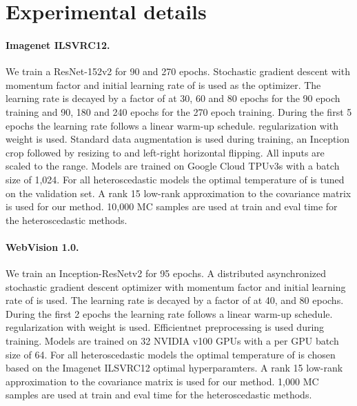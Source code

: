 \documentclass[final]{cvpr}
\begin{document}
\section{Experimental details}
\label{app:experimental_details}

\paragraph{Imagenet ILSVRC12.} We train a ResNet-152v2 \cite{he2016deep} for 90 and 270 epochs. Stochastic gradient descent with momentum factor  and initial learning rate of  is used as the optimizer. The learning rate is decayed by a factor of  at 30, 60 and 80 epochs for the 90 epoch training and 90, 180 and 240 epochs for the 270 epoch training. During the first 5 epochs the learning rate follows a linear warm-up schedule.  regularization with weight  is used. Standard data augmentation is used during training, an Inception crop followed by resizing to  and left-right horizontal flipping. All inputs are scaled to the  range. Models are trained on  Google Cloud TPUv3s with a batch size of 1,024. For all heteroscedastic models the optimal  temperature of  is tuned on the validation set. A rank 15 low-rank approximation to the covariance matrix is used for our method. 10,000 MC samples are used at train and eval time for the heteroscedastic methods.

\paragraph{WebVision 1.0.} We train an Inception-ResNetv2 \cite{inceptionresnet2017} for 95 epochs. A distributed asynchronized stochastic gradient descent optimizer with momentum factor  and initial learning rate of  is used. The learning rate is decayed by a factor of  at 40, and 80 epochs. During the first 2 epochs the learning rate follows a linear warm-up schedule.  regularization with weight  is used. Efficientnet \cite{tan2019efficientnet} preprocessing is used during training. Models are trained on 32 NVIDIA v100 GPUs with a per GPU batch size of 64. For all heteroscedastic models the optimal  temperature of  is chosen based on the Imagenet ILSVRC12 optimal hyperparamters. A rank 15 low-rank approximation to the covariance matrix is used for our method. 1,000 MC samples are used at train and eval time for the heteroscedastic methods.
\end{document}
